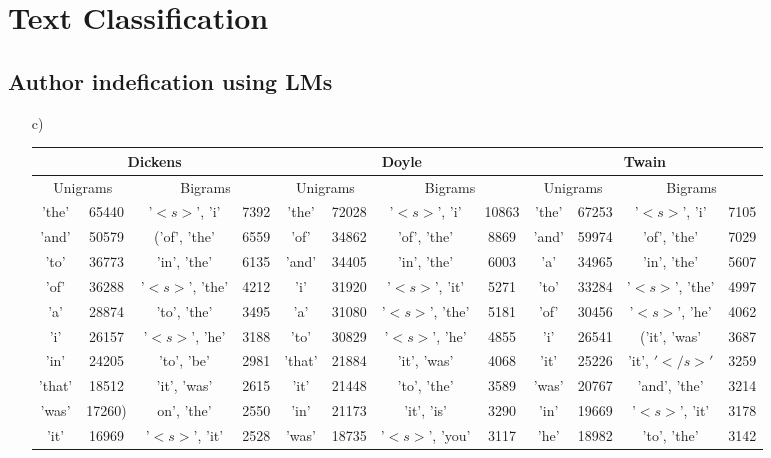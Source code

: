\documentclass{article}
\begin{document}
\section{}
\section{Text Classification}
\subsection{Author indefication using LMs}
\begin{itemize}
\item[c)]
\begin{table}[h]
\begin{adjustbox}{width=\columnwidth,center}
\begin{tabular}{|c c| c c|| c c| c c|| c c| c c |}
	\hline
	\multicolumn{4}{|c||}{Dickens}&\multicolumn{4}{c||}{Doyle}&\multicolumn{4}{c|}{Twain}\\\hline
	\multicolumn{2}{|c|}{Unigrams}&\multicolumn{2}{c||}{Bigrams}&\multicolumn{2}{c|}{Unigrams}&\multicolumn{2}{c||}{Bigrams}&\multicolumn{2}{|c|}{Unigrams}&\multicolumn{2}{c|}{Bigrams}\\\hline
	'the'& 65440&'$<s>$', 'i'& 7392&'the'& 72028&'$<s>$', 'i'& 10863&'the'& 67253&'$<s>$', 'i'& 7105\\
	'and'& 50579&('of', 'the'& 6559&'of'& 34862&'of', 'the'& 8869&'and'& 59974&'of', 'the'& 7029\\
	'to'& 36773&'in', 'the'& 6135&'and'& 34405&'in', 'the'& 6003&'a'& 34965&'in', 'the'& 5607\\
	'of'& 36288&'$<s>$', 'the'& 4212&'i'& 31920&'$<s>$', 'it'& 5271&'to'& 33284&'$<s>$', 'the'& 4997\\
	'a'& 28874&'to', 'the'& 3495&'a'& 31080&'$<s>$', 'the'& 5181&'of'& 30456&'$<s>$', 'he'& 4062\\
	'i'& 26157&'$<s>$', 'he'& 3188&'to'& 30829&'$<s>$', 'he'& 4855&'i'& 26541&('it', 'was'& 3687\\
	'in'& 24205&'to', 'be'& 2981&'that'& 21884&'it', 'was'& 4068&'it'& 25226&'it', $'</s>'$& 3259\\
	'that'& 18512&'it', 'was'& 2615&'it'& 21448&'to', 'the'& 3589&'was'& 20767&'and', 'the'& 3214\\
	'was'&17260)&on', 'the'& 2550&'in'& 21173&'it', 'is'& 3290&'in'& 19669&'$<s>$', 'it'& 3178\\
	'it'& 16969&'$<s>$', 'it'& 2528&'was'& 18735&'$<s>$', 'you'& 3117&'he'& 18982&'to', 'the'& 3142\\

\end{tabular}
\end{adjustbox}
\end{table}
\end{itemize}
\end{document}
